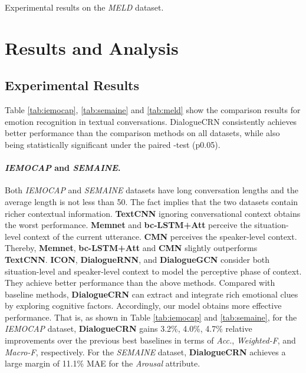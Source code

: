 \documentclass[11pt,a4paper]{article}
\begin{document}
\begin{table}[t]
\centering
\caption{Experimental results on the {\it MELD} dataset. } \label{tab:meld}
\end{table}



\section{Results and Analysis}
\subsection{Experimental Results}




Table \ref{tab:iemocap}, \ref{tab:semaine} and \ref{tab:meld} show the comparison results for emotion recognition in textual conversations.
DialogueCRN consistently achieves better performance than the comparison methods on all datasets,
while also being statistically significant under the paired -test (p0.05).


\paragraph{\textit{IEMOCAP} and \textit{SEMAINE}.} Both {\it IEMOCAP} and {\it SEMAINE} datasets have long conversation lengths and the average length is not less than 50.
The fact implies that the two datasets contain richer contextual information. 
\textbf{TextCNN} ignoring conversational context obtains the worst performance.
\textbf{Memnet} and \textbf{bc-LSTM+Att} perceive the situation-level context of the current utterance. \textbf{CMN} perceives the speaker-level context.
Thereby, \textbf{Memnet}, \textbf{bc-LSTM+Att} and \textbf{CMN} slightly outperforms \textbf{TextCNN}.
\textbf{ICON}, \textbf{DialogueRNN}, and \textbf{DialogueGCN} consider both situation-level and speaker-level context to model the perceptive phase of context.
They achieve better performance than the above methods.
Compared with baseline methods, \textbf{DialogueCRN} can extract and integrate rich emotional clues by exploring cognitive factors. 
Accordingly, our model obtains more effective performance.
That is, as shown in Table \ref{tab:iemocap} and \ref{tab:semaine}, for the \textit{IEMOCAP} dataset, \textbf{DialogueCRN} gains 3.2\%, 4.0\%, 4.7\% relative improvements over the previous best baselines in terms of \textit{Acc.}, \textit{Weighted-F}, and \textit{Macro-F}, respectively.
For the \textit{SEMAINE} dataset, \textbf{DialogueCRN} achieves a large margin of 11.1\% MAE for the \textit{Arousal} attribute.
\end{document}
